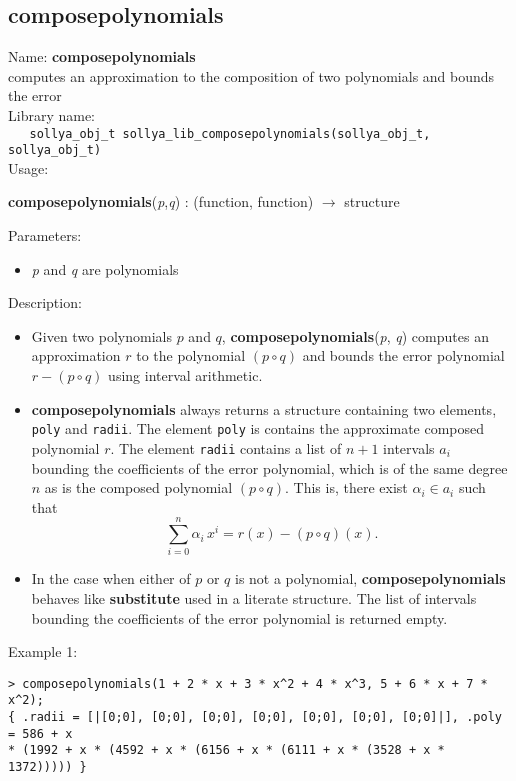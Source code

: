 \subsection{composepolynomials}
\label{labcomposepolynomials}
\noindent Name: \textbf{composepolynomials}\\
\phantom{aaa}computes an approximation to the composition of two polynomials and bounds the error\\[0.2cm]
\noindent Library name:\\
\verb|   sollya_obj_t sollya_lib_composepolynomials(sollya_obj_t, sollya_obj_t)|\\[0.2cm]
\noindent Usage: 
\begin{center}
\textbf{composepolynomials}(\emph{p},\emph{q}) : (\textsf{function}, \textsf{function}) $\rightarrow$ \textsf{structure}\\
\end{center}
Parameters: 
\begin{itemize}
\item \emph{p} and \emph{q} are polynomials
\end{itemize}
\noindent Description: \begin{itemize}

\item Given two polynomials $p$ and $q$, \textbf{composepolynomials}(\emph{p}, \emph{q}) computes an 
   approximation $r$ to the polynomial $(p \circ q)$ and bounds the
   error polynomial $r - (p \circ q)$ using interval arithmetic.

\item \textbf{composepolynomials} always returns a structure containing two elements,
   \texttt{poly} and \texttt{radii}.  The element
   \texttt{poly} is contains the approximate composed polynomial
   $r$. The element \texttt{radii} contains a list of $n + 1$ 
   intervals $a_i$ bounding the coefficients of the
   error polynomial, which is of the same degree $n$ as is the
   composed polynomial $(p \circ q)$.  This is, there exist
   $\alpha_i \in a_i$ such that 
   $$\sum\limits_{i=0}^n \alpha_i \, x^i = r(x) - (p \circ q)(x).$$

\item In the case when either of $p$ or $q$ is not a polynomial, \textbf{composepolynomials}
   behaves like \textbf{substitute} used in a literate structure. The list of intervals
   bounding the coefficients of the error polynomial is returned empty.
\end{itemize}
\noindent Example 1: 
\begin{center}\begin{minipage}{15cm}\begin{Verbatim}[frame=single]
> composepolynomials(1 + 2 * x + 3 * x^2 + 4 * x^3, 5 + 6 * x + 7 * x^2);
{ .radii = [|[0;0], [0;0], [0;0], [0;0], [0;0], [0;0], [0;0]|], .poly = 586 + x 
* (1992 + x * (4592 + x * (6156 + x * (6111 + x * (3528 + x * 1372))))) }
\end{Verbatim}
\end{minipage}\end{center}
